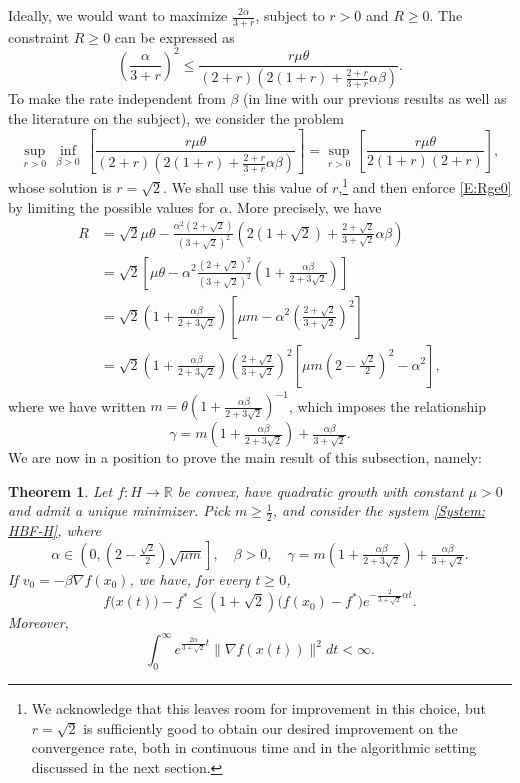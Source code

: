 \documentclass[pdflatex,sn-mathphys-num]{sn-jnl}
\theoremstyle{thmstyleone}
\newtheorem{theorem}{Theorem}
\theoremstyle{thmstyletwo}
\theoremstyle{thmstylethree}
\newcommand{\R}{\mathbb{R}}
\begin{document}
Ideally, we would want to maximize $\frac{2\alpha}{3+r}$, subject to $r>0$ and $R\ge 0$. The constraint $R\ge 0$ can be expressed as 
\begin{equation} \label{E:Rge0}
\left( \frac{\alpha}{3+r} \right)^2
\le \frac{ r\mu\theta }{ (2+r) \left( 2(1+r) + \frac{2+r}{3+r}\alpha\beta \right) }.
\end{equation}
To make the rate independent from $\beta$ (in line with our previous results as well as the literature on the subject), we consider the problem
$$\sup_{r>0}\,\inf_{\beta>0}\,\left[ \frac{ r\mu\theta }{ (2+r) \left( 2(1+r) + \frac{2+r}{3+r}\alpha\beta \right)}\right]=\sup_{r>0}\,\left[ \frac{ r\mu\theta }{ 2(1+r)(2+r)}\right],$$
whose solution is $r=\sqrt{2}$. We shall use this value of $r$,\footnote{We acknowledge that this leaves room for improvement in this choice, but $r=\sqrt{2}$ is sufficiently good to obtain our desired improvement on the convergence rate, both in continuous time and in the algorithmic setting discussed in the next section.} and then enforce \eqref{E:Rge0} by limiting the possible values for $\alpha$. More precisely, we have
\begin{align*}
R & = \sqrt{2}\mu\theta - \frac{\alpha^2(2+\sqrt{2})}{(3+\sqrt{2})^2}\left( 2(1+\sqrt{2}) + \frac{2+\sqrt{2}}{3+\sqrt{2}}\alpha\beta \right) \\
& = \sqrt{2}\left[\mu\theta-\alpha^2\frac{(2+\sqrt{2})^2}{(3+\sqrt{2})^2}\left(1+\frac{\alpha\beta}{2+3\sqrt{2}}\right)\right] \\
& = \sqrt{2}\left(1+\frac{\alpha\beta}{2+3\sqrt{2}}\right)\left[\mu m-\alpha^2\left(\frac{2+\sqrt{2}}{3+\sqrt{2}}\right)^2\right] \\
& = \sqrt{2}\left(1+\frac{\alpha\beta}{2+3\sqrt{2}}\right)\left(\frac{2+\sqrt{2}}{3+\sqrt{2}}\right)^2\left[\mu m\left(2-\frac{\sqrt{2}}{2}\right)^2-\alpha^2\right],
\end{align*}
where we have written $m=\theta\left(1+\frac{\alpha\beta}{2+3\sqrt{2}}\right)^{-1}$, which imposes the relationship
$$\gamma = m\left( 1 + \tfrac{\alpha\beta}{2+3\sqrt{2}} \right) + \tfrac{\alpha\beta}{3+\sqrt{2}}. $$
We are now in a position to prove the main result of this subsection, namely:

\begin{theorem}\label{Thm: QG_dynamics}
Let $f:H\to\R$ be convex, have quadratic growth with constant $\mu>0$ and admit a unique minimizer. Pick $m\ge \frac{1}{2}$, and consider the system \eqref{System: HBF-H}, where 
$$ \alpha\in\left( 0, \left( 2 - \tfrac{\sqrt{2}}{2} \right)\sqrt{\mu m} \right],\quad \beta > 0,\quad \gamma = m\left( 1 + \tfrac{\alpha\beta}{2+3\sqrt{2}} \right) + \tfrac{\alpha\beta}{3+\sqrt{2}}. $$
If $v_0 = -\beta\nabla f(x_0)$, we have, for every $t\ge 0$,
$$ f\big( x(t) \big) - f^* \le (1+\sqrt{2}) \big( f(x_0) - f^* \big) e^{-\frac{2}{3+\sqrt{2}}\alpha t }. $$
Moreover,
$$ \int_0^{\infty} e^{\frac{2\alpha}{3+\sqrt{2}}t}\| \nabla f\left(x(t)\right) \|^2 dt < \infty. $$
\end{theorem}
\end{document}
